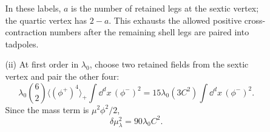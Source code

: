 \begin{enumerate}
\begin{enumerate}
\begin{enumerate}
\begin{center}
      \end{center}
      In these labels, \(a\) is the number of retained legs at the sextic
      vertex; the quartic vertex has \(2-a\).  This exhausts the allowed
      positive cross-contraction numbers after the remaining shell legs
      are paired into tadpoles.

      \item[(ii)]
      At first order in \(\lambda_0\), choose two retained fields from the
      sextic vertex and pair the other four:
      \[
        \lambda_0\binom62
          \langle(\phi^+)^4\rangle_+
          \int \dd^dx\,(\phi^-)^2
        =15\lambda_0(3C^2)
          \int \dd^dx\,(\phi^-)^2 .
      \]
      Since the mass term is \(\mu^2\phi^2/2\),
      \[
        \boxed{\delta\mu_{\lambda}^2=90\lambda_0C^2.}
        \tag{18.7.S5}
      \]


\end{enumerate}
\end{enumerate}
\end{enumerate}
